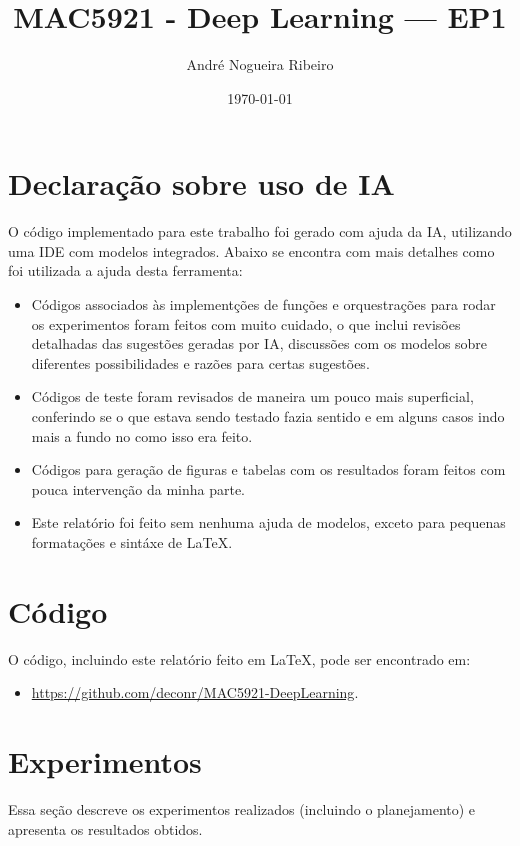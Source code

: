 \documentclass[11pt,a4paper]{article}
\title{MAC5921 - Deep Learning — EP1}
\author{André Nogueira Ribeiro}
\date{\today}
\begin{document}
\maketitle

\section{Declaração sobre uso de IA}

O código implementado para este trabalho foi gerado com ajuda da IA, utilizando uma IDE com modelos integrados. Abaixo se encontra com mais detalhes como foi utilizada a ajuda desta ferramenta:

\begin{itemize}
\item Códigos associados às implementções de funções e orquestrações para rodar os experimentos foram feitos com muito cuidado, o que inclui revisões detalhadas das sugestões geradas por IA, discussões com os modelos sobre diferentes possibilidades e razões para certas sugestões.
\item Códigos de teste foram revisados de maneira um pouco mais superficial, conferindo se o que estava sendo testado fazia sentido e em alguns casos indo mais a fundo no como isso era feito.
\item Códigos para geração de figuras e tabelas com os resultados foram feitos com pouca intervenção da minha parte.
\item Este relatório foi feito sem nenhuma ajuda de modelos, exceto para pequenas formatações e sintáxe de \LaTeX.
\end{itemize}

\section{Código}

O código, incluindo este relatório feito em \LaTeX, pode ser encontrado em:
\begin{itemize}
\item \href{https://github.com/deconr/MAC5921-DeepLearning}{https://github.com/deconr/MAC5921-DeepLearning}.
\end{itemize}

\section{Experimentos}

Essa seção descreve os experimentos realizados (incluindo o planejamento) e apresenta os resultados obtidos.
\end{document}
